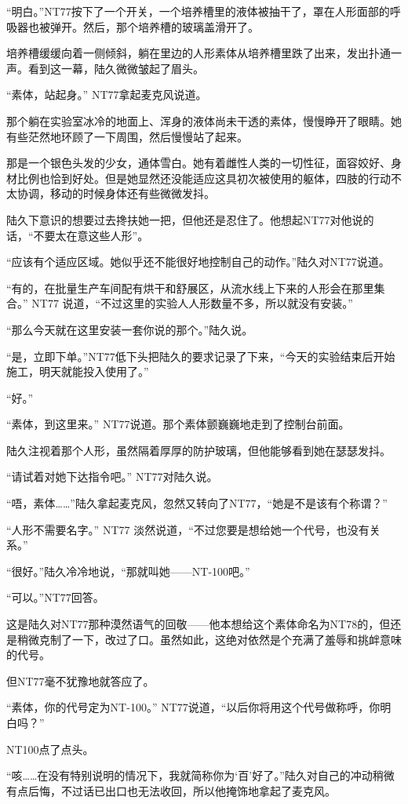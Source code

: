 “明白。”NT77按下了一个开关，一个培养槽里的液体被抽干了，罩在人形面部的呼吸器也被弹开。然后，那个培养槽的玻璃盖滑开了。

培养槽缓缓向着一侧倾斜，躺在里边的人形素体从培养槽里跌了出来，发出扑通一声。看到这一幕，陆久微微皱起了眉头。

“素体，站起身。” NT77拿起麦克风说道。

那个躺在实验室冰冷的地面上、浑身的液体尚未干透的素体，慢慢睁开了眼睛。她有些茫然地环顾了一下周围，然后慢慢站了起来。

那是一个银色头发的少女，通体雪白。她有着雌性人类的一切性征，面容姣好、身材比例也恰到好处。但是她显然还没能适应这具初次被使用的躯体，四肢的行动不太协调，移动的时候身体还有些微微发抖。

陆久下意识的想要过去搀扶她一把，但他还是忍住了。他想起NT77对他说的话，“不要太在意这些人形”。

“应该有个适应区域。她似乎还不能很好地控制自己的动作。”陆久对NT77说道。

“有的，在批量生产车间配有烘干和舒展区，从流水线上下来的人形会在那里集合。” NT77 说道，“不过这里的实验人人形数量不多，所以就没有安装。”

“那么今天就在这里安装一套你说的那个。”陆久说。

“是，立即下单。”NT77低下头把陆久的要求记录了下来，“今天的实验结束后开始施工，明天就能投入使用了。”

“好。”

“素体，到这里来。” NT77说道。那个素体颤巍巍地走到了控制台前面。

陆久注视着那个人形，虽然隔着厚厚的防护玻璃，但他能够看到她在瑟瑟发抖。

“请试着对她下达指令吧。” NT77对陆久说。

“唔，素体……”陆久拿起麦克风，忽然又转向了NT77，“她是不是该有个称谓？”

“人形不需要名字。” NT77 淡然说道，“不过您要是想给她一个代号，也没有关系。”

“很好。”陆久冷冷地说，“那就叫她——NT-100吧。”

“可以。”NT77回答。

这是陆久对NT77那种漠然语气的回敬——他本想给这个素体命名为NT78的，但还是稍微克制了一下，改过了口。虽然如此，这绝对依然是个充满了羞辱和挑衅意味的代号。

但NT77毫不犹豫地就答应了。

“素体，你的代号定为NT-100。” NT77说道，“以后你将用这个代号做称呼，你明白吗？”

NT100点了点头。

“咳……在没有特别说明的情况下，我就简称你为‘百’好了。”陆久对自己的冲动稍微有点后悔，不过话已出口也无法收回，所以他掩饰地拿起了麦克风。

